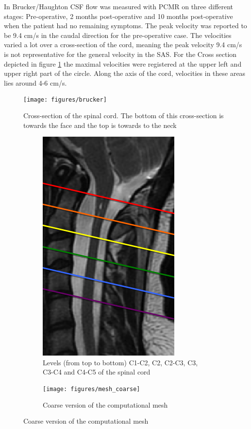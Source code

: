 In Brucker/Haughton CSF flow was measured with PCMR on three different stages: Pre-operative, 2 months post-operative and 10 months post-operative when the patient had no remaining symptoms. The peak velocity was reported to be 9.4 cm/s in the caudal direction for the pre-operative case. The velocities varied a lot over a cross-section of the cord, meaning the peak velocity 9.4 cm/s is not representative for the general velocity in the SAS. For the Cross section depicted in figure \ref{fig:CrossS}
the maximal velocities were registered at the upper left and upper right part of the circle. Along the axis of the cord, velocities in these areas lies around 4-6 cm/s. 
\begin{figure}[!h]
\begin{center}
\texttt{[image: figures/brucker]}
\caption{Cross-section of the spinal cord. The bottom of this cross-section is towards the face and the top is towards to the neck}\label{fig:CrossS}
\end{center}
\end{figure}
\begin{figure}[!h]
\begin{subfigure}[b]{0.5\linewidth}
\begin{center}
\includegraphics[width=0.7\linewidth]{figures/Syrinx_Levels}
\caption{Levels (from top to bottom) C1-C2, C2, C2-C3, C3, C3-C4 and C4-C5 of the spinal cord}
\end{center}
\end{subfigure}
\begin{subfigure}[b]{0.5\linewidth}
\begin{center}
\texttt{[image: figures/mesh\_coarse]}
\caption{Coarse version of the computational mesh}
\end{center}
\end{subfigure}
\end{figure}
